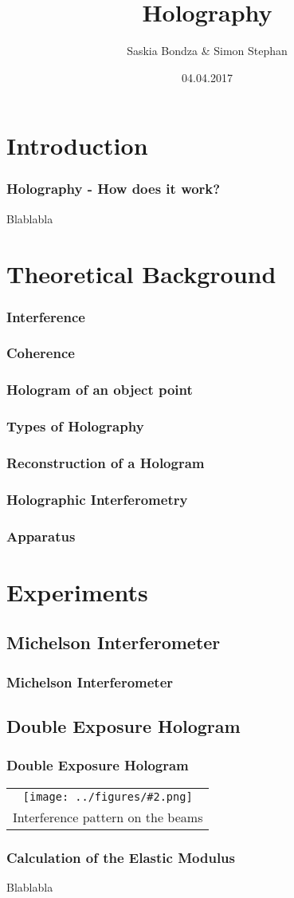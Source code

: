 \documentclass{beamer}
\title{Holography}
\author{Saskia Bondza \& Simon Stephan}
\date{04.04.2017}
\newcommand{\gra}[3][]{
	\begin{tabular}[width=\textwidth]{c}
		\texttt{[image: ../figures/\#2.png]}\\
		\small #3
	\end{tabular}
}
\begin{document}
\maketitle
\frame{\tableofcontents}
\section{Introduction}
\frame{\tableofcontents[currentsection]}
\begin{frame}
	\frametitle{Holography - How does it work?}
	Blablabla
\end{frame}

\section{Theoretical Background}
\frame{\tableofcontents[currentsection]}

\begin{frame}
	\frametitle{Interference}
\end{frame}
\begin{frame}
	\frametitle{Coherence}
\end{frame}
\begin{frame}
	\frametitle{Hologram of an object point}
\end{frame}
\begin{frame}
	\frametitle{Types of Holography}
\end{frame}
\begin{frame}
	\frametitle{Reconstruction of a Hologram}
\end{frame}
\begin{frame}
	\frametitle{Holographic Interferometry}
\end{frame}
\begin{frame}
	\frametitle{Apparatus}
\end{frame}
\section{Experiments}
\frame{\tableofcontents[currentsection]}
\subsection{Michelson Interferometer}
\frame{\tableofcontents[currentsubsection]}
\begin{frame}
	\frametitle{Michelson Interferometer}
\end{frame}
\subsection{Double Exposure Hologram}
\frame{\tableofcontents[currentsubsection]}
\begin{frame}
	\frametitle{Double Exposure Hologram}
	\gra[0.8]{staebe4}{Interference pattern on the beams}
\end{frame}
\begin{frame}
	\frametitle{Calculation of the Elastic Modulus}
	Blablabla
\end{frame}
\end{document}
